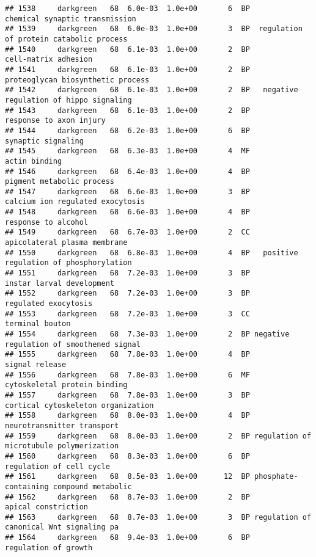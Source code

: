 \documentclass[]{article}
\begin{document}
\begin{verbatim}
## 1538     darkgreen   68  6.0e-03  1.0e+00       6  BP           chemical synaptic transmission
## 1539     darkgreen   68  6.0e-03  1.0e+00       3  BP  regulation of protein catabolic process
## 1540     darkgreen   68  6.1e-03  1.0e+00       2  BP                     cell-matrix adhesion
## 1541     darkgreen   68  6.1e-03  1.0e+00       2  BP        proteoglycan biosynthetic process
## 1542     darkgreen   68  6.1e-03  1.0e+00       2  BP   negative regulation of hippo signaling
## 1543     darkgreen   68  6.1e-03  1.0e+00       2  BP                  response to axon injury
## 1544     darkgreen   68  6.2e-03  1.0e+00       6  BP                       synaptic signaling
## 1545     darkgreen   68  6.3e-03  1.0e+00       4  MF                            actin binding
## 1546     darkgreen   68  6.4e-03  1.0e+00       4  BP                pigment metabolic process
## 1547     darkgreen   68  6.6e-03  1.0e+00       3  BP         calcium ion regulated exocytosis
## 1548     darkgreen   68  6.6e-03  1.0e+00       4  BP                      response to alcohol
## 1549     darkgreen   68  6.7e-03  1.0e+00       2  CC             apicolateral plasma membrane
## 1550     darkgreen   68  6.8e-03  1.0e+00       4  BP   positive regulation of phosphorylation
## 1551     darkgreen   68  7.2e-03  1.0e+00       3  BP                instar larval development
## 1552     darkgreen   68  7.2e-03  1.0e+00       3  BP                     regulated exocytosis
## 1553     darkgreen   68  7.2e-03  1.0e+00       3  CC                          terminal bouton
## 1554     darkgreen   68  7.3e-03  1.0e+00       2  BP negative regulation of smoothened signal
## 1555     darkgreen   68  7.8e-03  1.0e+00       4  BP                           signal release
## 1556     darkgreen   68  7.8e-03  1.0e+00       6  MF             cytoskeletal protein binding
## 1557     darkgreen   68  7.8e-03  1.0e+00       3  BP       cortical cytoskeleton organization
## 1558     darkgreen   68  8.0e-03  1.0e+00       4  BP               neurotransmitter transport
## 1559     darkgreen   68  8.0e-03  1.0e+00       2  BP regulation of microtubule polymerization
## 1560     darkgreen   68  8.3e-03  1.0e+00       6  BP                 regulation of cell cycle
## 1561     darkgreen   68  8.5e-03  1.0e+00      12  BP phosphate-containing compound metabolic 
## 1562     darkgreen   68  8.7e-03  1.0e+00       2  BP                      apical constriction
## 1563     darkgreen   68  8.7e-03  1.0e+00       3  BP regulation of canonical Wnt signaling pa
## 1564     darkgreen   68  9.4e-03  1.0e+00       6  BP                     regulation of growth

\end{verbatim}
\end{document}
